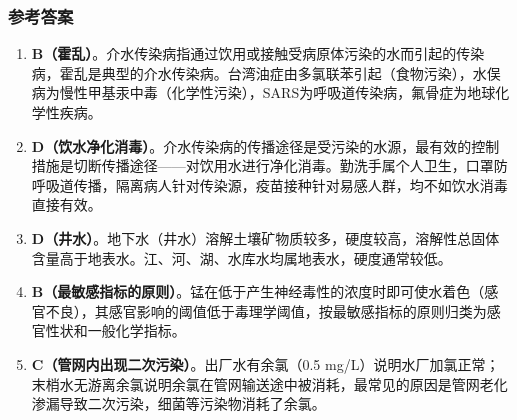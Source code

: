 \subsubsection*{参考答案}
\begin{enumerate}[leftmargin=*, itemsep=5pt]
    \item \textbf{B（霍乱）}。介水传染病指通过饮用或接触受病原体污染的水而引起的传染病，霍乱是典型的介水传染病。台湾油症由多氯联苯引起（食物污染），水俣病为慢性甲基汞中毒（化学性污染），SARS为呼吸道传染病，氟骨症为地球化学性疾病。
    \item \textbf{D（饮水净化消毒）}。介水传染病的传播途径是受污染的水源，最有效的控制措施是切断传播途径——对饮用水进行净化消毒。勤洗手属个人卫生，口罩防呼吸道传播，隔离病人针对传染源，疫苗接种针对易感人群，均不如饮水消毒直接有效。
    \item \textbf{D（井水）}。地下水（井水）溶解土壤矿物质较多，硬度较高，溶解性总固体含量高于地表水。江、河、湖、水库水均属地表水，硬度通常较低。
    \item \textbf{B（最敏感指标的原则）}。锰在低于产生神经毒性的浓度时即可使水着色（感官不良），其感官影响的阈值低于毒理学阈值，按最敏感指标的原则归类为感官性状和一般化学指标。
    \item \textbf{C（管网内出现二次污染）}。出厂水有余氯（0.5 mg/L）说明水厂加氯正常；末梢水无游离余氯说明余氯在管网输送途中被消耗，最常见的原因是管网老化渗漏导致二次污染，细菌等污染物消耗了余氯。
\end{enumerate}

\newpage

\newpage